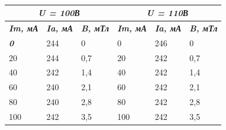 \documentclass[a4paper,12pt]{article}
\begin{document}
\newpage

\begin{table}[h]
\caption{}
\begin{center}
\begin{tabular}{|lll|lll|}
\hline
\multicolumn{3}{|c|}{\cellcolor[HTML]{FFFFFF}\textit{\textbf{U   = 100В}}}                                                                        & \multicolumn{3}{c|}{\textit{\textbf{U =   110В}}}                                                                        \\ \hline
\multicolumn{1}{|l|}{\cellcolor[HTML]{FFFFFF}\textit{\textbf{Im, мА}}} & \multicolumn{1}{l|}{\textit{\textbf{Ia, мА}}} & \textit{\textbf{B, мТл}} & \multicolumn{1}{l|}{\textit{\textbf{Im, мА}}} & \multicolumn{1}{l|}{\textit{\textbf{Ia, мА}}} & \textit{\textbf{B, мТл}} \\ \hline
\multicolumn{1}{|l|}{\cellcolor[HTML]{FFFFFF}\textit{\textbf{0}}}      & \multicolumn{1}{l|}{244}                      & 0                        & \multicolumn{1}{l|}{0}                        & \multicolumn{1}{l|}{246}                      & 0                        \\ \hline
\multicolumn{1}{|l|}{20}                                               & \multicolumn{1}{l|}{244}                      & 0,7                      & \multicolumn{1}{l|}{20}                       & \multicolumn{1}{l|}{242}                      & 0,7                      \\ \hline
\multicolumn{1}{|l|}{40}                                               & \multicolumn{1}{l|}{242}                      & 1,4                      & \multicolumn{1}{l|}{40}                       & \multicolumn{1}{l|}{242}                      & 1,4                      \\ \hline
\multicolumn{1}{|l|}{60}                                               & \multicolumn{1}{l|}{240}                      & 2,1                      & \multicolumn{1}{l|}{60}                       & \multicolumn{1}{l|}{242}                      & 2,1                      \\ \hline
\multicolumn{1}{|l|}{80}                                               & \multicolumn{1}{l|}{240}                      & 2,8                      & \multicolumn{1}{l|}{80}                       & \multicolumn{1}{l|}{242}                      & 2,8                      \\ \hline
\multicolumn{1}{|l|}{100}                                              & \multicolumn{1}{l|}{242}                      & 3,5                      & \multicolumn{1}{l|}{100}                      & \multicolumn{1}{l|}{242}                      & 3,5                      \\ \hline

\end{tabular}
\end{center}
\end{table}
\end{document}
